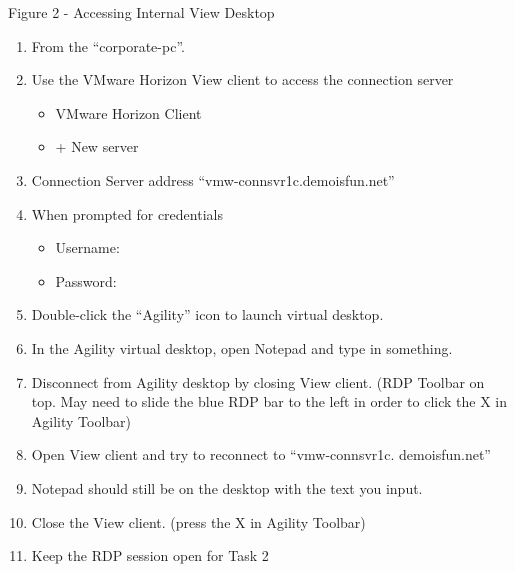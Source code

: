 \documentclass[letterpaper,10pt,english]{sphinxmanual}
\begin{document}
Figure 2 - Accessing Internal View Desktop
\begin{enumerate}
\item {} 
From the “corporate-pc”.

\item {} 
Use the VMware Horizon View client to access the connection server

\begin{itemize}
\item {} 
VMware Horizon Client

\item {} 
+ New server

\end{itemize}

\item {} 
Connection Server address “vmw-connsvr1c.demoisfun.net”

\item {} 
When prompted for credentials
\begin{itemize}
\item {} 
Username: 

\item {} 
Password: 

\end{itemize}

\item {} 
Double-click the “Agility” icon to launch virtual desktop.

\item {} 
In the Agility virtual desktop, open Notepad and type in something.

\item {} 
Disconnect from Agility desktop by closing View client. (RDP Toolbar
on top. May need to slide the blue RDP bar to the left in order to
click the X in Agility Toolbar)

\item {} 
Open View client and try to reconnect to “vmw-connsvr1c.
demoisfun.net”

\item {} 
Notepad should still be on the desktop with the text you input.

\item {} 
Close the View client. (press the X in Agility Toolbar)

\item {} 
Keep the RDP session open for Task 2

\end{enumerate}
\end{document}
